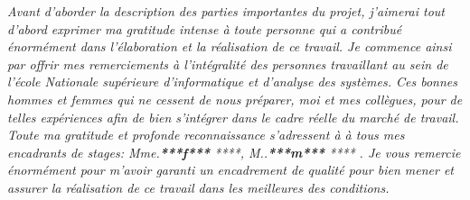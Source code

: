 \documentclass[a4paper]{report}
\begin{document}
\begin{doublespace}

    \textit{
        Avant d'aborder la description des parties importantes du projet,
        j'aimerai tout d’abord exprimer ma gratitude
        intense à toute personne qui a contribué énormément dans l'élaboration
        et la réalisation de ce travail. Je commence
        ainsi par offrir mes remerciements à l'intégralité des personnes
        travaillant au sein de l’école Nationale supérieure d’informatique et d’analyse
        des systèmes. Ces bonnes hommes et femmes qui ne cessent de nous préparer, moi
        et
        mes collègues, pour de telles expériences afin de bien s’intégrer dans
        le cadre réelle du marché de travail.
        Toute ma gratitude et profonde reconnaissance s’adressent à à tous mes
        encadrants de stages: Mme.\textbf{***f***} ****,
        M..\textbf{***m***} ****   . Je vous remercie énormément pour m'avoir
        garanti un encadrement de qualité pour bien mener
        et assurer la réalisation de ce travail dans les meilleures des
        conditions.
    }

\end{doublespace}
\end{document}
